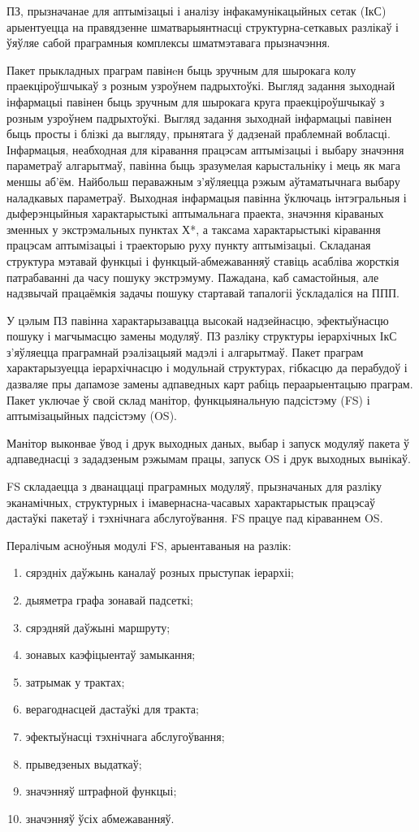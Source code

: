 ПЗ, прызначанае для аптымізацыі і аналізу інфакамунікацыйных сетак (ІкС) арыентуецца на правядзенне шматварыянтнасці структурна-сеткавых разлікаў і ўяўляе сабой праграмныя комплексы шматмэтавага прызначэння.

Пакет прыкладных праграм павінeн быць зручным для шырокага колу праекціроўшчыкаў з розным узроўнем падрыхтоўкі. Выгляд задання зыходнай інфармацыі павінен быць зручным для шырокага круга праекціроўшчыкаў з розным узроўнем падрыхтоўкі. Выгляд задання зыходнай інфармацыі павінен быць просты і блізкі да выгляду, прынятага ў дадзенай праблемнай вобласці. Інфармацыя, неабходная для кіравання працэсам аптымізацыі і выбару значэння параметраў алгарытмаў, павінна быць зразумелая карыстальніку і мець як мага меншы аб'ём. Найбольш пераважным з'яўляецца рэжым аўтаматычнага выбару наладкавых параметраў. Выходная інфармацыя павінна ўключаць інтэгральныя і дыферэнцыйныя характарыстыкі аптымальнага праекта, значэння кіраваных зменных у экстрэмальных пунктах Х*, а таксама характарыстыкі кіравання працэсам аптымізацыі і траекторыю руху пункту аптымізацыі. Складаная структура мэтавай функцыі і функцый-абмежаванняў ставіць асабліва жорсткія патрабаванні да часу пошуку экстрэмуму. Пажадана, каб самастойныя, але надзвычай працаёмкія задачы пошуку стартавай тапалогіі ўскладаліся на ППП.

У цэлым ПЗ павінна характарызавацца высокай надзейнасцю, эфектыўнасцю пошуку і магчымасцю замены модуляў.
ПЗ разліку структуры іерархічных ІкС з'яўляецца праграмнай рэалізацыяй мадэлі і алгарытмаў. Пакет праграм характарызуецца іерархічнасцю і модульнай структурах, гібкасцю да перабудоў і дазваляе пры дапамозе замены адпаведных карт рабіць пераарыентацыю праграм.
Пакет уключае ў свой склад манітор, функцыянальную падсістэму (FS) і аптымізацыйных падсістэму (OS).

Манітор выконвае ўвод і друк выходных даных, выбар і запуск модуляў пакета ў адпаведнасці з зададзеным рэжымам працы, запуск OS і друк выходных вынікаў.

FS складаецца з дванаццаці праграмных модуляў, прызначаных для разліку эканамічных, структурных і імавернасна-часавых характарыстык працэсаў дастаўкі пакетаў і тэхнічнага абслугоўвання. FS працуе пад кіраваннем OS.

Пералічым асноўныя модулі FS, арыентаваныя на разлік:
\begin{enumerate}
    \item сярэдніх даўжынь каналаў розных прыступак іерархіі;
    \item дыяметра графа зонавай падсеткі;
    \item сярэдняй даўжыні маршруту;
    \item зонавых каэфіцыентаў замыкання;
    \item затрымак у трактах;
    \item верагоднасцей дастаўкі для тракта;
    \item эфектыўнасці тэхнічнага абслугоўвання;
    \item прыведзеных выдаткаў;
    \item значэнняў штрафной функцыі;
    \item значэнняў ўсіх абмежаванняў.
\end{enumerate}

